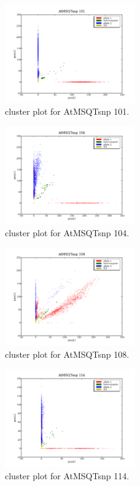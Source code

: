 \begin{figure}[H]
\includegraphics[width=0.5\textwidth]{figures/cluster_plot_AtMSQTsnp_101.png}
\caption{cluster plot for AtMSQTsnp 101.} \label{flAtMSQTsnp101}
\end{figure}

\begin{figure}[H]
\includegraphics[width=0.5\textwidth]{figures/cluster_plot_AtMSQTsnp_104.png}
\caption{cluster plot for AtMSQTsnp 104.} \label{flAtMSQTsnp104}
\end{figure}

\begin{figure}[H]
\includegraphics[width=0.5\textwidth]{figures/cluster_plot_AtMSQTsnp_108.png}
\caption{cluster plot for AtMSQTsnp 108.} \label{flAtMSQTsnp108}
\end{figure}

\begin{figure}[H]
\includegraphics[width=0.5\textwidth]{figures/cluster_plot_AtMSQTsnp_114.png}
\caption{cluster plot for AtMSQTsnp 114.} \label{flAtMSQTsnp114}
\end{figure}

